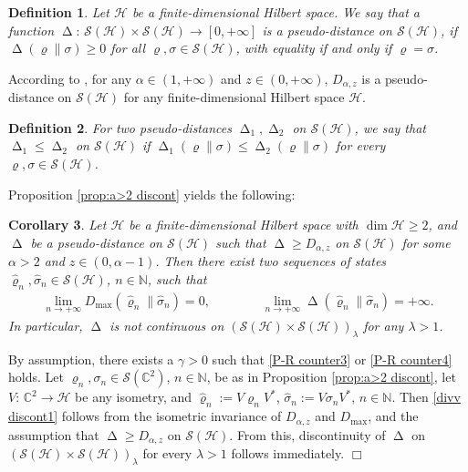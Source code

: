 \documentclass[unsortedaddress,superscriptaddress,pra,notitlepage]{revtex4}
\newtheorem{definition}{Definition}[section]
\newtheorem{cor}[definition]{Corollary}
\newenvironment{proof}[1][Proof]{\begin{trivlist}
\item[\hskip \labelsep {\bfseries #1}]}{\hfill$\Box$\end{trivlist}}
\def\S{{\mathcal S}}
\def\bN{\mathbb{N}}
\def\bC{\mathbb{C}}
\def\rho{\varrho}
\def\hil{{\mathcal H}}
\def\bz{\left(}
\def\jz{\right)}
\newcommand{\ki}[1]{\textit{\textit{#1}}}
\newcommand{\ds}{\mbox{ }\mbox{ }}
\DeclareMathOperator{\divv}{\Delta}
\begin{document}
\begin{definition}
Let $\hil$ be a finite-dimensional Hilbert space.
We say that a function $\divv:\,\S(\hil)\times\S(\hil)\to[0,+\infty]$
is a \ki{pseudo-distance} on $\S(\hil)$, if 
$\divv(\rho\|\sigma)\ge 0$ for all $\rho,\sigma\in\S(\hil)$, with equality if and only if $\rho=\sigma$.
\end{definition}

According to \cite[Proposition A.30]{MO-cqconv-cc}, 
for any $\alpha\in(1,+\infty)$ and $z\in(0,+\infty)$,
$D_{\alpha,z}$ is a pseudo-distance on $\S(\hil)$ for any finite-dimensional Hilbert space 
$\hil$.

\begin{definition}
For two pseudo-distances $\divv_1,\divv_2$ on $\S(\hil)$, we say that 
$\divv_1\le\divv_2$ on $\S(\hil)$ if 
$\divv_1(\rho\|\sigma)\le\divv_2(\rho\|\sigma)$ for every $\rho,\sigma\in\S(\hil)$.
\end{definition}

Proposition \ref{prop:a>2 discont} yields the following:

\begin{cor}\label{cor:a>2 discont}
Let $\hil$ be a finite-dimensional Hilbert space with $\dim\hil\ge 2$, 
and $\divv$ be a pseudo-distance on $\S(\hil)$ such that 
$\divv\ge D_{\alpha,z}$ on $\S(\hil)$
for some $\alpha>2$ and $z\in(0,\alpha-1)$.
Then there exist two sequences of states 
$\hat\rho_n,\hat\sigma_n\in\S(\hil)$, $n\in\bN$, such that 
\begin{align}\label{divv discont1}
\lim_{n\to+\infty}D_{\max}(\hat\rho_n\|\hat\sigma_n)=0,
\ds\ds\ds
\lim_{n\to+\infty}\divv(\hat\rho_n\|\hat\sigma_n)=+\infty.
\end{align}
In particular, 
$\divv$
is not continuous on 
$\bz\S(\hil)\times\S(\hil)\jz_{\lambda}$
for any $\lambda>1$.
\end{cor}
\begin{proof}
By assumption, there exists a $\gamma>0$ such that 
\eqref{P-R counter3} or \eqref{P-R counter4} holds.
Let $\rho_n,\sigma_n\in\S(\bC^2)$, $n\in\bN$, be
as in Proposition \ref{prop:a>2 discont}, let $V:\,\bC^2\to\hil$ be any isometry, and 
$\hat\rho_n:=V\rho_n V^*$, 
$\hat\sigma_n:=V\sigma_n V^*$, $n\in\bN$.
Then \eqref{divv discont1} follows from the 
isometric invariance of $D_{\alpha,z}$ and $D_{\max}$, and the assumption that 
$\divv\ge D_{\alpha,z}$ on $\S(\hil)$.
From this, discontinuity of $\divv$ on $\bz\S(\hil)\times\S(\hil)\jz_{\lambda}$ 
for every $\lambda>1$ follows immediately.
\end{proof}
\end{document}

